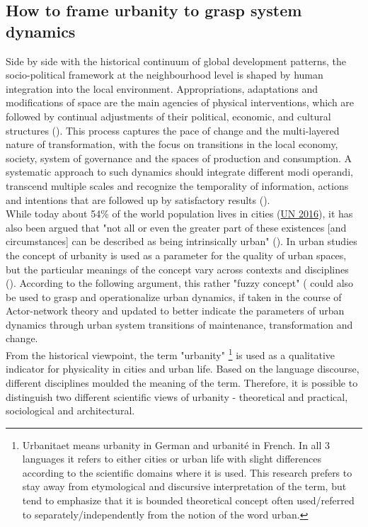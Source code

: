 \documentclass[11pt]{report}
\begin{document}
{{{\subsection{How to frame urbanity to grasp system dynamics}

Side by side with the historical continuum of global development patterns, the socio-political framework at the neighbourhood level is shaped by human integration into the local environment.
Appropriations, adaptations and modifications of space are the main agencies of physical interventions, which are followed by continual adjustments of their political, economic, and cultural structures (\href{Sykola}{\citealt{sykora_transitional_1999}}).
This process captures the pace of change and the multi-layered nature of transformation, with the focus on transitions in the local economy, society, system of governance and the spaces of production and consumption. A systematic approach to such dynamics should integrate different modi operandi, transcend multiple scales and recognize the temporality of information, actions and intentions that are followed up by satisfactory results  (\href{Tardin}{\citealt{tardin_landscape_2014}}).
\\

While today about 54\% of the world population lives in cities (\href{UN}{UN 2016}), it has also been argued that "not all or even the greater part of these existences [and circumstances] can be described as being intrinsically urban"
(\href{Scott}{\citealt{scott_nature_2015}}).
In urban studies the concept of urbanity is used as a parameter for the quality of urban spaces, but the particular meanings of the concept vary across contexts and disciplines (\citealt{bisson_urbanity:_2016}).
According to the following argument, this rather "fuzzy concept" (\citealt{Bourdin 2010} could also be used to grasp and operationalize urban dynamics, if taken in the course of Actor-network theory and updated to better indicate the parameters of urban dynamics through urban system transitions of maintenance, transformation and change.
\\

From the historical viewpoint, the term "urbanity"
\footnote{Urbanitaet means urbanity in German and urbanité in French. In all 3 languages it refers to either cities or urban life with slight differences according to the scientific domains where it is used.
This research prefers to stay away from etymological and discursive interpretation of the term, but tend to emphasize that it is bounded theoretical concept often used/referred to separately/independently from the notion of the word urban.}
is used as a qualitative indicator for physicality in cities and urban life. 
Based on the language discourse, different disciplines moulded the meaning of the term.
Therefore, it is possible to distinguish two different scientific views of urbanity - theoretical and practical, sociological and architectural.
\\

}}}
\end{document}
